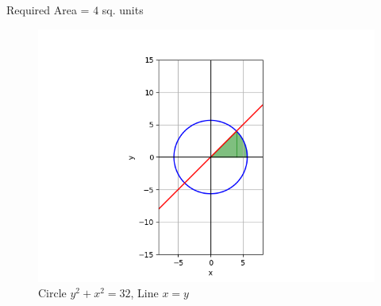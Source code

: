 \documentclass[journal]{IEEEtran}
\begin{document}
Required Area = $4$ sq. units
\begin{figure}[h!]
   \centering
   \includegraphics[width = 1\linewidth]{figs/fig.png}
   \caption{Circle $y^2+x^2=32$, Line $x=y$}
   \label{stemplot}
\end{figure}
\end{document}
